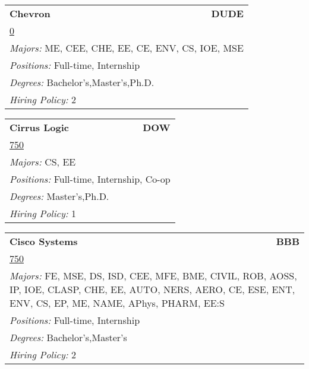 \documentclass[twoside]{article}
\begin{document}
\begin{center}
\begin{multicols}{3}
\begin{FlushLeft}
\begin{minipage}{.9\columnwidth}
\end{minipage}
 
\begin{minipage}{.9\columnwidth}\begin{tabularx}{.95\columnwidth}{Xr}
                 {\Large\bf Chevron} & {\Large\bf DUDE}\\
    \multicolumn{2}{p{.95\columnwidth}}{\url{0}}\\
    \multicolumn{2}{p{.95\columnwidth}}{\emph{Majors:} ME, CEE, CHE, EE, CE, ENV, CS, IOE, MSE}\\
    \multicolumn{2}{p{.95\columnwidth}}{\emph{Positions:} Full-time, Internship}\\
    \multicolumn{2}{p{.95\columnwidth}}{\emph{Degrees:} Bachelor's,Master's,Ph.D.}\\
    \multicolumn{2}{p{.95\columnwidth}}{\emph{Hiring Policy:} 2}\\
    \end{tabularx}
    
\end{minipage}
 
\begin{minipage}{.9\columnwidth}\begin{tabularx}{.95\columnwidth}{Xr}
                 {\Large\bf Cirrus Logic} & {\Large\bf DOW}\\
    \multicolumn{2}{p{.95\columnwidth}}{\url{750}}\\
    \multicolumn{2}{p{.95\columnwidth}}{\emph{Majors:} CS, EE}\\
    \multicolumn{2}{p{.95\columnwidth}}{\emph{Positions:} Full-time, Internship, Co-op}\\
    \multicolumn{2}{p{.95\columnwidth}}{\emph{Degrees:} Master's,Ph.D.}\\
    \multicolumn{2}{p{.95\columnwidth}}{\emph{Hiring Policy:} 1}\\
    \end{tabularx}
    
\end{minipage}
 
\begin{minipage}{.9\columnwidth}\begin{tabularx}{.95\columnwidth}{Xr}
                 {\Large\bf Cisco Systems} & {\Large\bf BBB}\\
    \multicolumn{2}{p{.95\columnwidth}}{\url{750}}\\
    \multicolumn{2}{p{.95\columnwidth}}{\emph{Majors:} FE, MSE, DS, ISD, CEE, MFE, BME, CIVIL, ROB, AOSS, IP, IOE, CLASP, CHE, EE, AUTO, NERS, AERO, CE, ESE, ENT, ENV, CS, EP, ME, NAME, APhys, PHARM, EE:S}\\
    \multicolumn{2}{p{.95\columnwidth}}{\emph{Positions:} Full-time, Internship}\\
    \multicolumn{2}{p{.95\columnwidth}}{\emph{Degrees:} Bachelor's,Master's}\\
    \multicolumn{2}{p{.95\columnwidth}}{\emph{Hiring Policy:} 2}\\
    \end{tabularx}
    

\end{minipage}
\end{FlushLeft}
\end{multicols}
\end{center}
\end{document}
